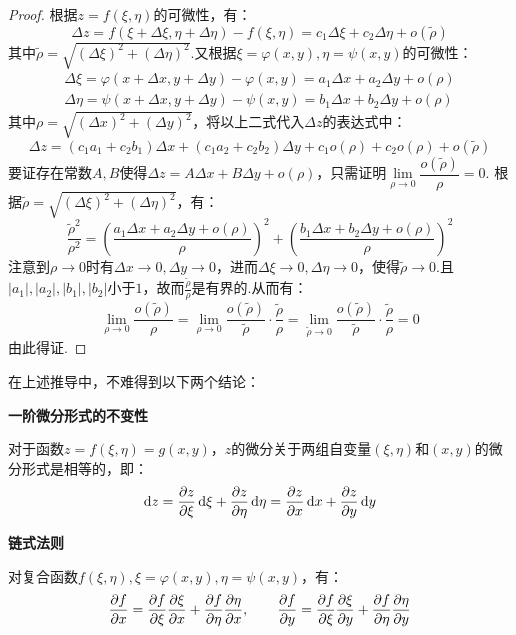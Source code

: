 \begin{proof}
    根据$z = f(\xi,\eta)$的可微性，有：
    \[\Delta z = f(\xi+\Delta\xi,\eta+\Delta\eta) - f(\xi,\eta) = c_1\Delta\xi + c_2\Delta\eta + o(\tilde{\rho})\]
    其中$\tilde{\rho} = \sqrt{(\Delta\xi)^2 + (\Delta\eta)^2}$.又根据$\xi=\varphi(x,y),\eta=\psi(x,y)$的可微性：
    \begin{gather*}
        \Delta \xi = \varphi(x+\Delta x,y+\Delta y) - \varphi(x,y) = a_1\Delta x + a_2\Delta y + o(\rho)\\
        \Delta \eta = \psi(x+\Delta x,y+\Delta y) - \psi(x,y) = b_1\Delta x + b_2\Delta y + o(\rho)
    \end{gather*}
    其中$\rho = \sqrt{(\Delta x)^2 + (\Delta y)^2}$，将以上二式代入$\Delta z$的表达式中：
    \[\Delta z = (c_1 a_1 + c_2 b_1)\Delta x + (c_1 a_2 + c_2 b_2)\Delta y + c_1 o(\rho) + c_2 o(\rho) + o(\tilde{\rho})\]
    要证存在常数$A,B$使得$\Delta z =A\Delta x + B\Delta y + o(\rho)$，只需证明$\lim\limits_{\rho \to 0}\dfrac{o(\tilde{\rho})}{\rho} = 0$.
    根据$\tilde{\rho} = \sqrt{(\Delta\xi)^2 + (\Delta\eta)^2}$，有：
    \[\frac{\tilde{\rho}^2}{\rho^2} = \left(\frac{a_1\Delta x + a_2\Delta y + o(\rho)}{\rho}\right)^2 + \left(\frac{b_1\Delta x + b_2\Delta y + o(\rho)}{\rho}\right)^2\]
    注意到$\rho\to0$时有$\Delta x\to0,\Delta y\to0$，进而$\Delta\xi\to0,\Delta\eta\to0$，使得$\tilde{\rho}\to0$.且$|a_1|,|a_2|,|b_1|,|b_2|$小于$1$，故而$\frac{\tilde{\rho}}{\rho}$是有界的.从而有：
    \[\lim_{\rho\to0}\frac{o(\tilde{\rho})}{\rho} = \lim_{\rho\to0}\frac{o(\tilde{\rho})}{\tilde{\rho}}\cdot\frac{\tilde{\rho}}{\rho} = \lim_{\tilde{\rho}\to0}\frac{o(\tilde{\rho})}{\tilde{\rho}}\cdot\frac{\tilde{\rho}}{\rho} = 0\]
    由此得证.
\end{proof}
在上述推导中，不难得到以下两个结论：
\begin{theorem}
    \textbf{一阶微分形式的不变性}

    对于函数$z = f(\xi,\eta) = g(x,y)$，$z$的微分关于两组自变量$(\xi,\eta)$和$(x,y)$的微分形式是相等的，即：
    \[\dd{z} = \pdv{z}{\xi}\dd{\xi} + \pdv{z}{\eta}\dd{\eta} = \pdv{z}{x}\dd{x} + \pdv{z}{y}\dd{y}\]
\end{theorem}
\begin{theorem}
    \textbf{链式法则}

    对复合函数$f(\xi,\eta),\xi = \varphi(x,y),\eta = \psi(x,y)$，有：
    \[\pdv{f}{x} = \pdv{f}{\xi}\pdv{\xi}{x} + \pdv{f}{\eta}\pdv{\eta}{x},\qquad \pdv{f}{y} = \pdv{f}{\xi}\pdv{\xi}{y} + \pdv{f}{\eta}\pdv{\eta}{y}\]
\end{theorem}


